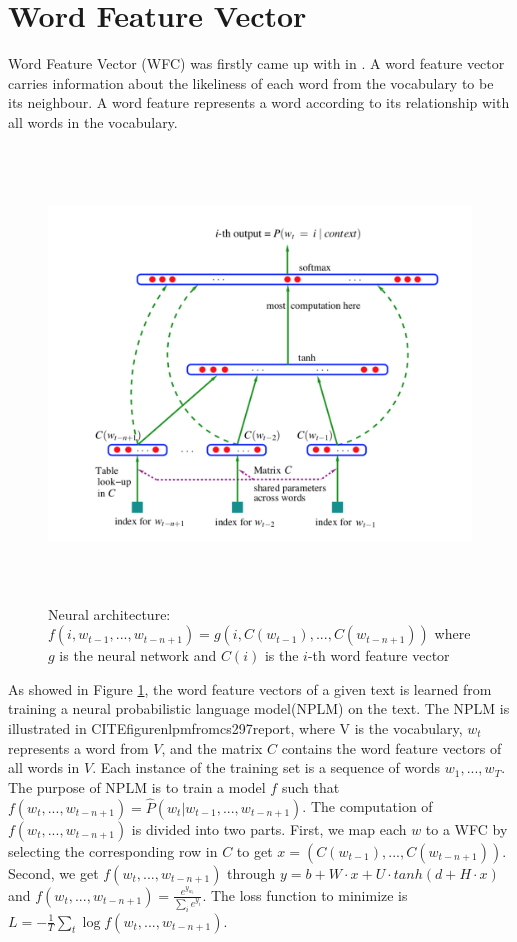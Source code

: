 \documentclass[modernstyle,12pt]{sjsuthesis}
\theoremstyle{definition}
\begin{document}
\section{Word Feature Vector}
Word Feature Vector (WFC) was firstly came up with in \cite{bengio2003neural}. A word feature vector carries information about the likeliness of each word from the vocabulary to be its neighbour. A word feature represents a word according to its relationship with all words in the vocabulary.

\begin{figure}[htbp]\centering
  \includegraphics[width=15cm, height=12cm]{figures/nplm_architecture.png}
  \caption{Neural architecture: $f(i,w_{t-1},... ,w_{t-n+1}) =g(i,C(w_{t-1}),... ,C(w_{t-n+1}))$ where $g$ is the neural network and $C(i)$ is the $i$-th word feature vector\cite{bengio2003neural}}
  \label{f:nplm_architecture.png}
\end{figure}

As showed in Figure \ref{f:nplm_architecture.png}, the word feature vectors of a given text is learned from training a neural probabilistic language model(NPLM) on the text. The NPLM is illustrated in CITEfigurenlpmfromcs297report, where V is the vocabulary, $w_t$ represents a word from $V$, and the matrix $C$ contains the word feature vectors of all words in $V$. Each instance of the training set is a sequence of words $w_1,...,w_T$. The purpose of NPLM is to train a model $f$ such that $ f(w_t, ..., w_{t-n+1}) = \hat{P}(w_t | w_{t-1},...,w_{t-n+1})$. The computation of $f(w_t, ..., w_{t-n+1})$ is divided into two parts.
First, we map each $w$ to a WFC by selecting the corresponding row in $C$ to get $x=(C(w_{t-1}),... ,C(w_{t-n+1}))$. Second, we get $f(w_t, ..., w_{t-n+1})$ through $y=b+W\cdot x + U\cdot tanh(d + H\cdot x)$ and $ f(w_t, ..., w_{t-n+1}) = \frac{e^{y_{w_t}}}{\sum_{i}^{}e^{y_i}}$. The loss function to minimize is $L = -\frac{1}{T}\sum _{t}^{} \log{f(w_t, ..., w_{t-n+1})}$.
\end{document}
